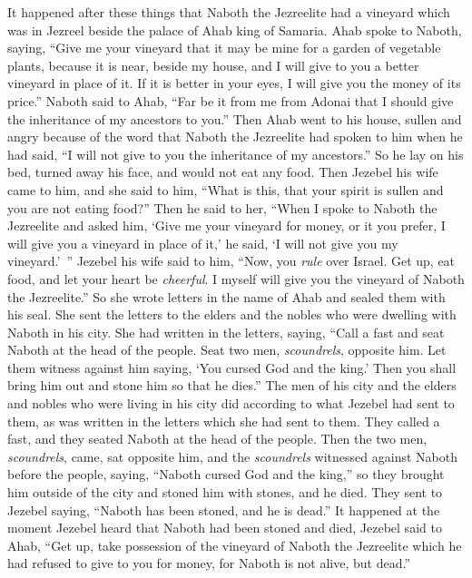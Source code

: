 \begin{biblechapter} %
 It happened after these things that Naboth the Jezreelite had a vineyard which was in Jezreel beside the palace of Ahab king of Samaria.
\verse Ahab spoke to Naboth, saying, “Give me your vineyard that it may be mine for a garden of vegetable plants, because it is near, beside my house, and I will give to you a better vineyard in place of it. If it is better in your eyes, I will give you the money of its price.”
\verse Naboth said to Ahab, “Far be it from me from Adonai that I should give the inheritance of my ancestors to you.”
\verse Then Ahab went to his house, sullen and angry because of the word that Naboth the Jezreelite had spoken to him when he had said, “I will not give to you the inheritance of my ancestors.” So he lay on his bed, turned away his face, and would not eat any food.
\verse Then Jezebel his wife came to him, and she said to him, “What is this, that your spirit is sullen and you are not eating food?”
\verse Then he said to her, “When I spoke to Naboth the Jezreelite and asked him, ‘Give me your vineyard for money, or it you prefer, I will give you a vineyard in place of it,’ he said, ‘I will not give you my vineyard.’ ”
\verse Jezebel his wife said to him, “Now, you \textit{rule} over Israel. Get up, eat food, and let your heart be \textit{cheerful}. I myself will give you the vineyard of Naboth the Jezreelite.”
\verse So she wrote letters in the name of Ahab and sealed them with his seal. She sent the letters to the elders and the nobles who were dwelling with Naboth in his city.
\verse She had written in the letters, saying, “Call a fast and seat Naboth at the head of the people.
\verse Seat two men, \textit{scoundrels}, opposite him. Let them witness against him saying, ‘You cursed God and the king.’ Then you shall bring him out and stone him so that he dies.”
\verse The men of his city and the elders and nobles who were living in his city did according to what Jezebel had sent to them, as was written in the letters which she had sent to them.
\verse They called a fast, and they seated Naboth at the head of the people.
\verse Then the two men, \textit{scoundrels}, came, sat opposite him, and the \textit{scoundrels} witnessed against Naboth before the people, saying, “Naboth cursed God and the king,” so they brought him outside of the city and stoned him with stones, and he died.
\verse They sent to Jezebel saying, “Naboth has been stoned, and he is dead.”
\verse It happened at the moment Jezebel heard that Naboth had been stoned and died, Jezebel said to Ahab, “Get up, take possession of the vineyard of Naboth the Jezreelite which he had refused to give to you for money, for Naboth is not alive, but dead.”

\end{biblechapter}
